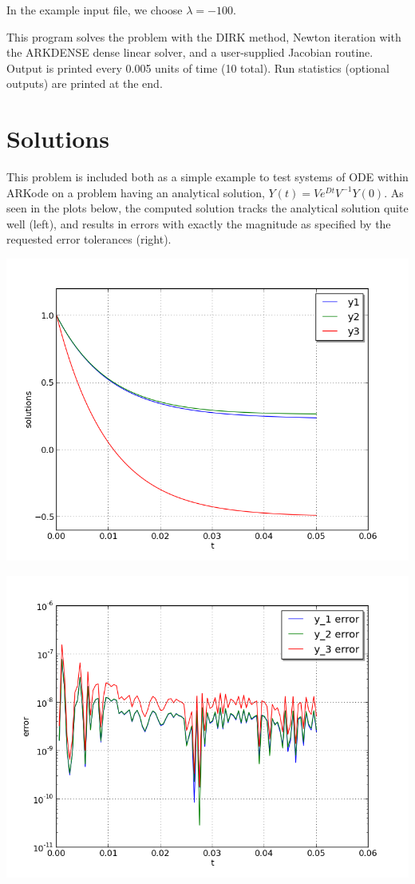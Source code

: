 \documentclass[letterpaper,10pt,english]{sphinxmanual}
\begin{document}
In the example input file, we choose $\lambda = -100$.

This program solves the problem with the DIRK method,
Newton iteration with the ARKDENSE dense linear solver, and a
user-supplied Jacobian routine.
Output is printed every 0.005 units of time (10 total).
Run statistics (optional outputs) are printed at the end.


\section{Solutions}
\label{ark_analytic_sys:solutions}
This problem is included both as a simple example to test systems of
ODE within ARKode on a problem having an analytical
solution, $Y(t) = V e^{Dt} V^{-1} Y(0)$.  As
seen in the plots below, the computed solution tracks the analytical solution
quite well (left), and results in errors with exactly the magnitude as
specified by the requested error tolerances (right).

\includegraphics[width=0.450\linewidth]{plot-ark_analytic_sys.png}

\includegraphics[width=0.450\linewidth]{plot-ark_analytic_sys_error.png}
\end{document}
